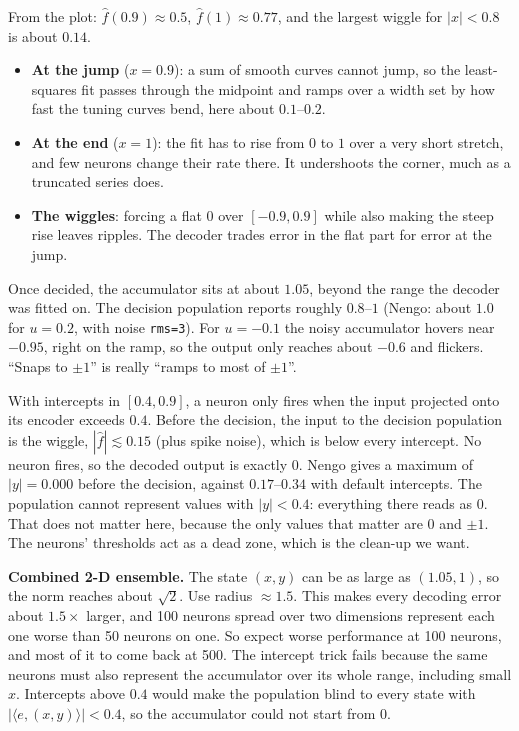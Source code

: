 \documentclass[11pt,letterpaper]{article}
\newcommand{\ans}[1]{\par\vspace{4pt}{\bfseries #1}\quad}
\begin{document}
\ans{Q1}
From the plot: $\hat f(0.9) \approx 0.5$, $\hat f(1) \approx 0.77$, and the largest wiggle for $|x| < 0.8$ is about $0.14$.
\begin{itemize}[leftmargin=1.2em]
\item \textbf{At the jump} ($x = 0.9$): a sum of smooth curves cannot jump, so the least-squares fit passes through the midpoint and ramps over a width set by how fast the tuning curves bend, here about $0.1$--$0.2$.
\item \textbf{At the end} ($x = 1$): the fit has to rise from $0$ to $1$ over a very short stretch, and few neurons change their rate there. It undershoots the corner, much as a truncated series does.
\item \textbf{The wiggles}: forcing a flat $0$ over $[-0.9, 0.9]$ while also making the steep rise leaves ripples. The decoder trades error in the flat part for error at the jump.
\end{itemize}
Once decided, the accumulator sits at about $1.05$, beyond the range the decoder was fitted on. The decision population reports roughly $0.8$--$1$ (Nengo: about $1.0$ for $u = 0.2$, with noise \texttt{rms=3}). For $u = -0.1$ the noisy accumulator hovers near $-0.95$, right on the ramp, so the output only reaches about $-0.6$ and flickers. ``Snaps to $\pm1$'' is really ``ramps to most of $\pm1$''.

\ans{Q2}
With intercepts in $[0.4, 0.9]$, a neuron only fires when the input projected onto its encoder exceeds $0.4$. Before the decision, the input to the decision population is the wiggle, $|\hat f| \lesssim 0.15$ (plus spike noise), which is below every intercept. No neuron fires, so the decoded output is exactly $0$. Nengo gives a maximum of $|y| = 0.000$ before the decision, against $0.17$--$0.34$ with default intercepts. The population cannot represent values with $|y| < 0.4$: everything there reads as $0$. That does not matter here, because the only values that matter are $0$ and $\pm1$. The neurons' thresholds act as a dead zone, which is the clean-up we want.

\textbf{Combined 2-D ensemble.} The state $(x, y)$ can be as large as $(1.05, 1)$, so the norm reaches about $\sqrt2$. Use radius $\approx 1.5$. This makes every decoding error about $1.5\times$ larger, and 100 neurons spread over two dimensions represent each one worse than 50 neurons on one. So expect worse performance at 100 neurons, and most of it to come back at 500. The intercept trick fails because the same neurons must also represent the accumulator over its whole range, including small $x$. Intercepts above $0.4$ would make the population blind to every state with $|\langle e, (x, y)\rangle| < 0.4$, so the accumulator could not start from $0$.
\end{document}
